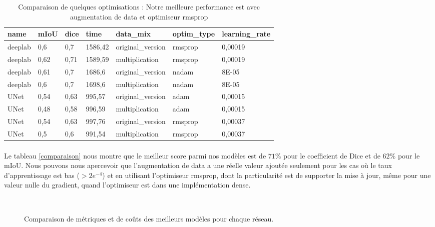 \documentclass[
10pt,
a4paper, 
oneside, 
headinclude,footinclude, 
]{scrartcl}
\begin{document}
\begin{table}[h]\center
\begin{tabular}{@{}lllllll@{}}
\toprule
name    & mIoU & dice & time    & data\_mix         & optim\_type & learning\_rate \\ \midrule
deeplab & 0,6  & 0,7  & 1586,42 & original\_version & rmsprop     & 0,00019        \\
deeplab & 0,62 & 0,71 & 1589,59 & multiplication    & rmsprop     & 0,00019        \\
deeplab & 0,61 & 0,7  & 1686,6  & original\_version & nadam       & 8E-05          \\
deeplab & 0,6  & 0,7  & 1698,6  & multiplication    & nadam       & 8E-05          \\
UNet    & 0,54 & 0,63 & 995,57  & original\_version & adam        & 0,00015        \\
UNet    & 0,48 & 0,58 & 996,59  & multiplication    & adam        & 0,00015        \\
UNet    & 0,54 & 0,63 & 997,76  & original\_version & rmsprop     & 0,00037        \\
UNet    & 0,5  & 0,6  & 991,54  & multiplication    & rmsprop     & 0,00037        \\ \bottomrule
\end{tabular}
\caption[Comparaison de quelques optimisations]{Comparaison de quelques optimisations : Notre meilleure performance est avec augmentation de data et optimiseur rmsprop}
\label{comparaison_table}
\end{table}

\paragraph{}Le tableau \ref{comparaison} nous montre que le meilleur score parmi nos modèles est de $71$\% pour le  coefficient de Dice et de $62$\% pour le mIoU. Nous pouvons nous apercevoir que l’augmentation de data a une réelle valeur ajoutée seulement pour les cas où le taux d’apprentissage est bas ($>2e^{-4}$) et en utilisant l’optimiseur rmsprop, dont la particularité est de supporter la mise à jour, même pour une valeur nulle du gradient, quand l’optimiseur est dans une implémentation dense.

\begin{figure}[htb]
\centering
{} \quad
{} \\
 \quad
{}
\caption[Mesure des Performances]{Comparaison de métriques et de coûts des meilleurs modèles pour chaque réseau.} 
\label{fig:comparaison}
\end{figure}
\end{document}
